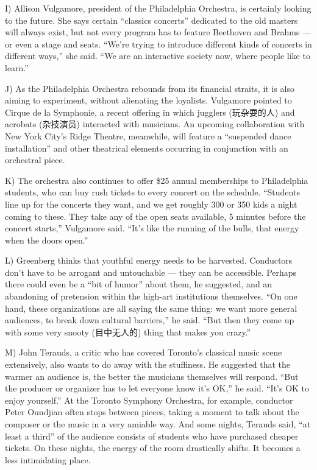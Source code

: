 \documentclass[UTF8,11pt]{ctexart}
\begin{document}
I) Allison Vulgamore, president of the Philadelphia Orchestra, is certainly looking to the future. She says certain “classics concerts” dedicated to the old masters will always exist, but not every program has to feature Beethoven and Brahms — or even a stage and seats. “We’re trying to introduce different kinds of concerts in different ways,” she said. “We are an interactive society now, where people like to learn.”


J) As the Philadelphia Orchestra rebounds from its financial straits, it is also aiming to experiment, without alienating the loyalists. Vulgamore pointed to Cirque de la Symphonie, a recent offering in which jugglers (玩杂耍的人) and acrobats (杂技演员) interacted with musicians. An upcoming collaboration with New York City’s Ridge Theatre, meanwhile, will feature a “suspended dance installation” and other theatrical elements occurring in conjunction with an orchestral piece.


K) The orchestra also continues to offer \$25 annual memberships to Philadelphia students, who can buy rush tickets to every concert on the schedule. “Students line up for the concerts they want, and we get roughly 300 or 350 kids a night coming to these. They take any of the open seats available, 5 minutes before the concert starts,” Vulgamore said. “It’s like the running of the bulls, that energy when the doors open.”


L) Greenberg thinks that youthful energy needs to be harvested. Conductors don’t have to be arrogant and untouchable — they can be accessible. Perhaps there could even be a “bit of humor” about them, he suggested, and an abandoning of pretension within the high-art institutions themselves. “On one hand, these organizations are all saying the same thing: we want more general audiences, to break down cultural barriers,” he said. “But then they come up with some very snooty (目中无人的) thing that makes you crazy.”


M) John Terauds, a critic who has covered Toronto’s classical music scene extensively, also wants to do away with the stuffiness. He suggested that the warmer an audience is, the better the musicians themselves will respond. “But the producer or organizer has to let everyone know it’s OK,” he said. “It’s OK to enjoy yourself.” At the Toronto Symphony Orchestra, for example, conductor Peter Oundjian often stops between pieces, taking a moment to talk about the composer or the music in a very amiable way. And some nights, Terauds said, “at least a third” of the audience consists of students who have purchased cheaper tickets. On these nights, the energy of the room drastically shifts. It becomes a less intimidating place.
\end{document}
